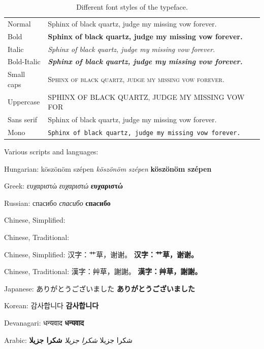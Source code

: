 \begin{table}
\begin{tabular}{@{}lll@{}}
\toprule
Normal      & Sphinx of black quartz, judge my missing vow forever. \\
Bold        & \textbf{Sphinx of black quartz, judge my missing vow forever.} \\
Italic      & \textit{Sphinx of black quartz, judge my missing vow forever.} \\
Bold-Italic & \textbf{\textit{Sphinx of black quartz, judge my missing vow forever.}} \\
Small caps  & \textsc{Sphinx of black quartz, judge my missing vow forever.} \\
Uppercase   & \uppercase{Sphinx of black quartz, judge my missing vow for} \\
Sans serif  & \textsf{Sphinx of black quartz, judge my missing vow forever.} \\
Mono        & \texttt{Sphinx of black quartz, judge my missing vow forever.} \\ \bottomrule
\end{tabular}
\caption{Different font styles of the typeface.}
\end{table}


\bigskip

Various scripts and languages:

Hungarian: köszönöm szépen \textit{köszönöm szépen} \textbf{köszönöm szépen}

Greek: ευχαριστώ \textit{ευχαριστώ} \textbf{ευχαριστώ}

Russian: спасибо \textit{спасибо} \textbf{спасибо}

Chinese, Simplified: 

Chinese, Traditional: 

Chinese, Simplified: 汉字：艹草，谢谢。 \textbf{汉字：艹草，谢谢。}

Chinese, Traditional: 漢字：艸草，謝謝。 \textbf{漢字：艸草，謝謝。}

Japanese: ありがとうございました \textbf{ありがとうございました }

Korean: 감사합니다 \textbf{감사합니다}

\textnormal
Devanagari: धन्यवाद \textbf{धन्यवाद}

Arabic: شكرا جزيلا  \textit{شكرا جزيلا} \textbf{شكرا جزيلا}

